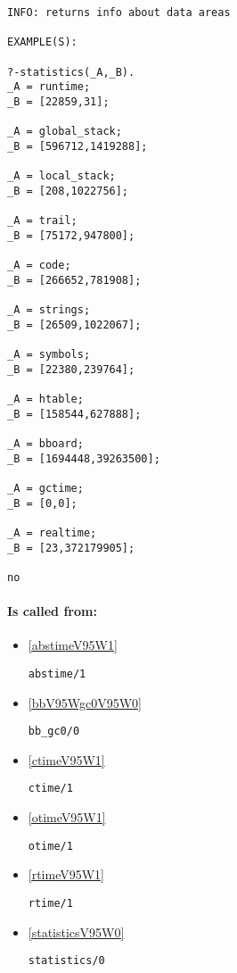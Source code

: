 {\small \begin{verbatim}
INFO: returns info about data areas

EXAMPLE(S):

?-statistics(_A,_B).
_A = runtime;
_B = [22859,31];

_A = global_stack;
_B = [596712,1419288];

_A = local_stack;
_B = [208,1022756];

_A = trail;
_B = [75172,947800];

_A = code;
_B = [266652,781908];

_A = strings;
_B = [26509,1022067];

_A = symbols;
_B = [22380,239764];

_A = htable;
_B = [158544,627888];

_A = bboard;
_B = [1694448,39263500];

_A = gctime;
_B = [0,0];

_A = realtime;
_B = [23,372179905];

no

\end{verbatim}}
\paragraph{Is called from:} 
\begin{itemize}
\item \ref{abstimeV95W1} 
\begin{verbatim}
abstime/1
\end{verbatim}

\item \ref{bbV95Wgc0V95W0} 
\begin{verbatim}
bb_gc0/0
\end{verbatim}

\item \ref{ctimeV95W1} 
\begin{verbatim}
ctime/1
\end{verbatim}

\item \ref{otimeV95W1} 
\begin{verbatim}
otime/1
\end{verbatim}

\item \ref{rtimeV95W1} 
\begin{verbatim}
rtime/1
\end{verbatim}

\item \ref{statisticsV95W0} 
\begin{verbatim}
statistics/0
\end{verbatim}

\end{itemize}

